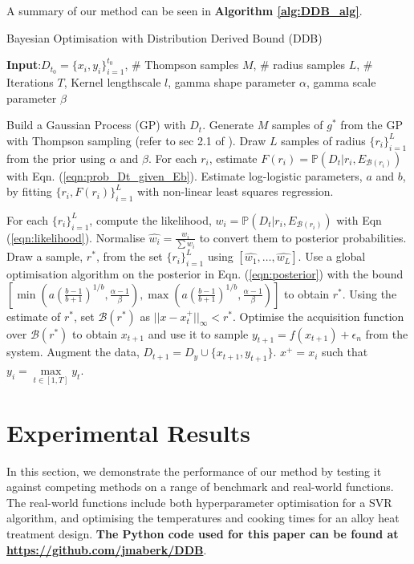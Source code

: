 \documentclass[preprint]{elsarticle}
\begin{document}
A summary of our method can be seen in \textbf{Algorithm \ref{alg:DDB_alg}}.
\begin{algorithm}[tb]
\caption{Bayesian Optimisation with Distribution Derived Bound (DDB)}
\label{alg:DDB_alg}
\textbf{Input}:$D_{t_0}=\lbrace x_i,y_i\rbrace_{i=1}^{t_0}$, \# Thompson samples $M$, \# radius samples $L$, \# Iterations $T$, Kernel lengthscale $l$, gamma shape parameter $\alpha$, gamma scale parameter $\beta$
\begin{algorithmic}[1] %
\STATE Build a Gaussian Process (GP) with $D_{t}$.
\STATE Generate $M$ samples of $g^*$ from the GP with Thompson sampling (refer to sec 2.1 of \cite{hernandez2014predictive}).
\STATE Draw $L$ samples of radius $\{r_i\}_{i=1}^L$ from the prior using $\alpha$ and $\beta$.
\STATE For each $r_i$, estimate $F(r_i)=\mathbb{P}(D_t|r_i,E_{\mathcal{B}(r_i)})$ with Eqn. (\ref{eqn:prob_Dt_given_Eb}).
\STATE Estimate log-logistic parameters, $a$ and $b$, by fitting $\{r_i,F(r_i)\}_{i=1}^L$ with non-linear least squares regression.

\STATE For each $\{r_i\}_{i=1}^L$, compute the likelihood, $w_i=\mathbb{P}(D_t|r_i,E_{\mathcal{B}(r_i)})$ with Eqn (\ref{eqn:likelihood}).
\STATE Normalise $\hat{w_i}=\frac{w_i}{\sum w_i}$ to convert them to posterior probabilities.
\STATE Draw a sample, $r^*$, from the set $\{r_i\}_{i=1}^L$ using $[\hat{w_1},\ldots,\hat{w_L}]$.
\ENDIF
{}
\STATE Use a global optimisation algorithm on the posterior in Eqn. (\ref{eqn:posterior}) with the bound $\left[\min\left(a\left(\frac{b-1}{b+1}\right)^{1/b},\frac{\alpha-1}{\beta}\right),\max\left(a\left(\frac{b-1}{b+1}\right)^{1/b},\frac{\alpha-1}{\beta}\right)\right]$ to obtain $r^*$.
\ENDIF
\STATE Using the estimate of $r^*$, set $\mathcal{B}(r^*)$ as $||x-x_t^+||_\infty<r^*$.
\STATE Optimise the acquisition function over $\mathcal{B}(r^*)$ to obtain $x_{t+1}$ and use it to sample $y_{t+1}=f(x_{t+1})+\epsilon_n$ from the system.
\STATE Augment the data, $D_{t+1}=D_y\cup\{x_{t+1},y_{t+1}\}$.
\ENDFOR
\RETURN $x^+=x_i$ such that $y_i=\underset{t\in [1,T]}{\max} y_t$.

\end{algorithmic}
\end{algorithm}

\section{Experimental Results}\label{sec:Results}
In this section, we demonstrate the performance of our method by testing it against competing methods on a range of benchmark and real-world functions. The real-world functions include both hyperparameter optimisation for a SVR algorithm, and optimising the temperatures and cooking times for an alloy heat treatment design. \textbf{The Python code used for this paper can be found at \url{https://github.com/jmaberk/DDB}}.
\end{document}

